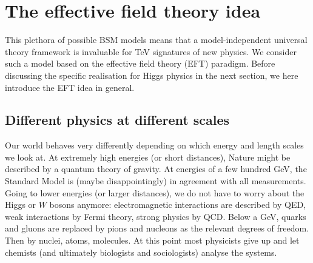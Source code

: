\section{The effective field theory idea}
\label{sec:foundations_eft}


This plethora of possible BSM models means that a model-independent
universal theory framework is invaluable for TeV signatures of new
physics. We consider such a model based on the effective field theory
(EFT) paradigm. Before discussing the specific realisation for Higgs
physics in the next section, we here introduce the EFT idea in
general.




\subsection{Different physics at different scales}
\label{sec:foundations_scales}

Our world behaves very differently depending on which energy and
length scales we look at. At extremely high energies (or short
distances), Nature might be described by a quantum theory of
gravity. At energies of a few hundred GeV, the Standard Model is
(maybe disappointingly) in agreement with all measurements. Going to lower
energies (or larger distances), we do not have to worry about the Higgs or
$W$ bosons anymore: electromagnetic interactions are described by QED,
weak interactions by Fermi theory, strong physics by QCD. Below a GeV,
quarks and gluons are replaced by pions and nucleons as the relevant
degrees of freedom. Then by nuclei, atoms, molecules. At this point
most physicists give up and let chemists (and ultimately biologists
and sociologists) analyse the systems.

